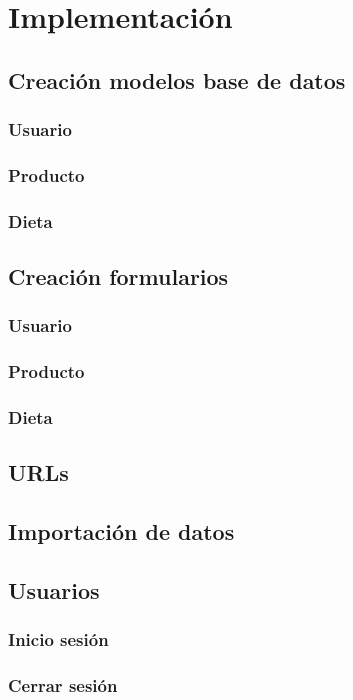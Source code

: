 \chapter{Implementación}

\section{Creación modelos base de datos}
\subsection{Usuario}
\subsection{Producto}
\subsection{Dieta}

\section{Creación formularios}
\subsection{Usuario}
\subsection{Producto}
\subsection{Dieta}

\section{URLs}

\section{Importación de datos}

\section{Usuarios}
\subsection{Inicio sesión}
\subsection{Cerrar sesión}
